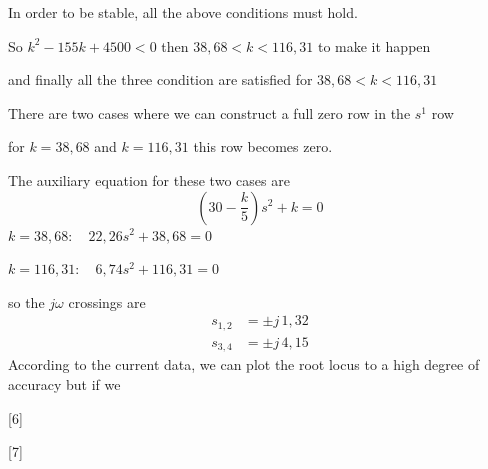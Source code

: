 \documentclass[11pt,a4paper]{article}
\begin{document}
In order to be stable, all the above conditions must hold.

So $k^2-155k+4500<0$ then $38{,}68<k<116{,}31$ to make it happen

and finally all the three condition are satisfied for $38{,}68<k<116{,}31$

There are two cases where we can construct a full zero row in the $s^1$ row

for $k=38{,}68$ and $k=116{,}31$ this row becomes zero.

The auxiliary equation for these two cases are
\[
\left(30-\frac{k}{5}\right)s^2+k=0
\]
 $k=38{,}68:\quad 22{,}26s^2+38{,}68=0$

 $k=116{,}31:\quad 6{,}74s^2+116{,}31=0$

so the $j\omega$ crossings are
\begin{align*}
s_{1,2} &= \pm j\,1{,}32\\
s_{3,4} &= \pm j\,4{,}15
\end{align*}
According to the current data, we can plot the root locus to a high degree of accuracy but if we

[6]

[7]
\end{document}
